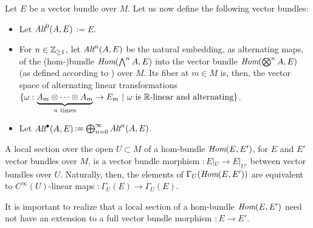\begin{definition}
Let $E$ be a vector bundle over $M$. Let us now define the following vector bundles:
    \begin{itemize}
    
    \item Let \emph{$\operatorname{\textit{Alt}}^0(A, E)$}$:= E$. 
    
    \item For $n \in \mathbb{Z}_{\geq 1}$, let \emph{$\operatorname{\textit{Alt}}^n(A, E)$} be the natural embedding, as alternating maps, of the (hom-)bundle $\operatorname{\textit{Hom}}(\bigwedge^n A, E)$ into the vector bundle $\operatorname{\textit{Hom}}(\bigotimes^n A, E)$ (as defined according to \cite{Tu2017}) over $M$. Its fiber at $m \in M$ is, then, the vector space of alternating linear transformations $\{\omega: \underbrace{A_m \otimes \cdots \otimes A_m}_{\text{$n$ times}} \to E_m \ |\  \text{$\omega$ is $\mathbb{R}$-linear and alternating}\}$.
    
    \item Let \emph{$\operatorname{\textit{Alt}}^\bullet(A, E)$}$:= \bigoplus^\infty_{n = 0} \operatorname{\textit{Alt}}^n(A, E)$.
    
        
    \end{itemize}
    
\end{definition}

\begin{remark}
A local section over the open $U \subset M$ of a hom-bundle $\operatorname{\textit{Hom}}(E, E')$, for $E$ and $E'$ vector bundles over $M$, is a vector bundle morphism $:E|_U \to E|_{U'}$ between vector bundles over $U$. Naturally, then, the elements of $\Gamma_U(\operatorname{\textit{Hom}}(E, E'))$ are equivalent to $C^\infty(U)$-linear maps $: \Gamma_U(E) \to \Gamma_U(E)$. 

It is important to realize that a local section of a hom-bundle $\operatorname{\textit{Hom}}(E, E')$ need not have an extension to a full vector bundle morphism $:E \to E'$.%
\end{remark}

